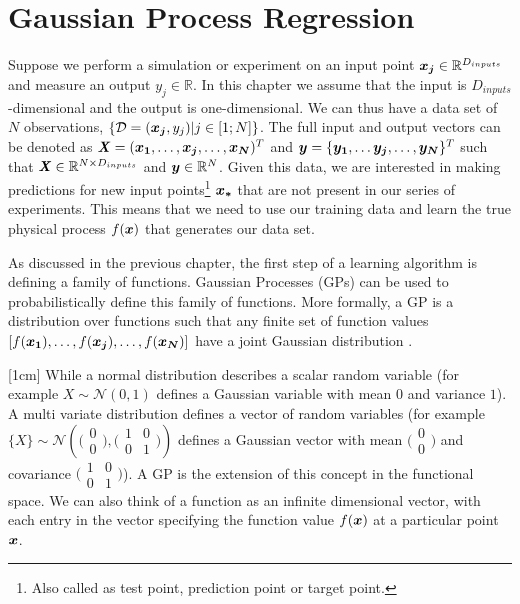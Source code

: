 \chapter{Gaussian Process Regression}
\label{chapGp}
Suppose we perform a simulation or experiment on an input point $\boldsymbol{x_{j}} \in \mathbb{R}^{D_{inputs}}$and measure an output $y_{j} \in \mathbb{R}$. In this chapter we assume that the input is $D_{inputs}$-dimensional and the output is one-dimensional. We can thus have a data set of $N$ observations, $\{\mathcal{D} = (\boldsymbol{x_{j}}, y_{j}) | j \in [1; N] \}$. The full input and output vectors can be denoted as $\bm{\mathit{X}} = (\boldsymbol{x_{1}}, \ldots , \boldsymbol{x_{j}}, \ldots, \boldsymbol{x_{N}})^T$ and $\boldsymbol{y} = \{\boldsymbol{y_{1}}, \ldots \boldsymbol{y_j}, \ldots, \boldsymbol{y_{N}}\}^T$ such that $\bm{\mathit{X}} \in \mathbb{R}^{N \times D_{inputs}}$ and $\boldsymbol{y} \in \mathbb{R}^{N }$. Given this data, we are interested in making predictions for new input points\footnote{Also called as test point, prediction point or target point.} $\boldsymbol{x_{*}}$ that are not present in our series of experiments. This means that we need to use our training data and learn the true physical process  $f(\boldsymbol{x})$ that generates our data set.

As discussed in the previous chapter, the first step of a learning algorithm is defining a family of functions. Gaussian Processes (GPs) can be used to probabilistically define this family of functions. More formally, a GP is a distribution over functions such that any finite set of function values $[f(\boldsymbol{x_{1}}), \ldots, f(\boldsymbol{x_{j}}), \ldots, f(\boldsymbol{x_{N}})]$ have a joint Gaussian distribution \cite{rasmussen2006gaussian}. 

[1cm]
While a normal distribution describes a scalar random variable (for example $X \sim \mathcal{N}(0, 1)$ defines a Gaussian variable with mean $0$ and variance $1$). A multi variate distribution defines a vector of random variables (for example $\{X\} \sim \mathcal{N}(\bigl( \begin{smallmatrix} 0\\ 0\end{smallmatrix}\bigr), \bigl( \begin{smallmatrix} 1 & 0\\ 0 & 1\end{smallmatrix}\bigr))$ defines a Gaussian vector with mean $\bigl( \begin{smallmatrix} 0\\ 0\end{smallmatrix}\bigr)$ and covariance $\bigl( \begin{smallmatrix} 1 & 0\\ 0 & 1\end{smallmatrix}\bigr)$). A GP is the extension of this concept in the functional space. We can also think of a function as an infinite dimensional vector, with each entry in the vector specifying the function value $f(\boldsymbol{x})$ at a particular point $\boldsymbol{x}$. 

